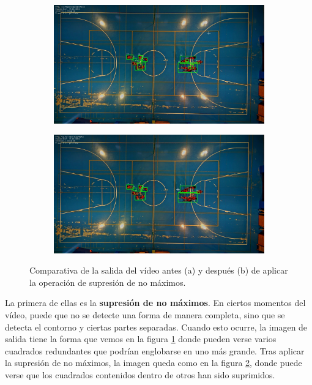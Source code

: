\begin{figure}
\begin{subfigure}{.5\textwidth}
  \centering
  \includegraphics[width=.9\linewidth]{images/nonms}
  \caption { }
  \label{fig:nms1a}
\end{subfigure}%
\begin{subfigure}{.5\textwidth}
  \centering
  \includegraphics[width=.9\linewidth]{images/nms}
  \caption { }
  \label{fig:nms1b}
\end{subfigure}
\caption{Comparativa de la salida del vídeo antes (a) y después (b) de aplicar la operación de supresión de no máximos. }
\label{fig:nms}
\end{figure}

La primera de ellas es la \textbf{supresión de no máximos}. En ciertos momentos del vídeo, puede que no se detecte una forma de manera completa, sino que se detecta el contorno y ciertas partes separadas. Cuando esto ocurre, la imagen de salida tiene la forma que vemos en la figura \ref{fig:nms1a} donde pueden verse varios cuadrados redundantes que podrían englobarse en uno más grande. Tras aplicar la supresión de no máximos, la imagen queda como en la figura \ref{fig:nms1b}, donde puede verse que los cuadrados contenidos dentro de otros han sido suprimidos.

